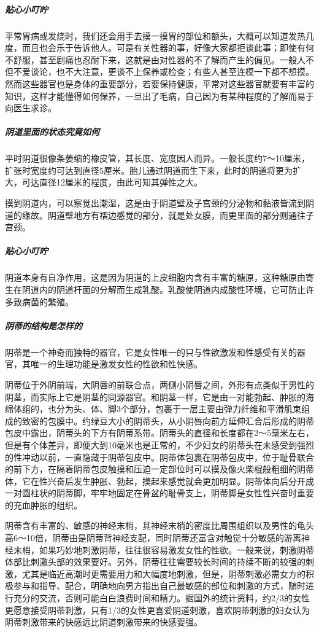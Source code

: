 \begin{enumerate}
\subparagraph{贴心小叮咛}
平常胃病或发烧时，我们还会用手去摸一摸胃的部位和额头，大概可以知道发热几度，而且也会乐于告诉他人。可是有关性器的事，好像大家都拒谈此事；即使有何不舒服，甚至剧痛也忍耐下来，这就是由对性器的不了解而产生的偏见。一般人不但不爱谈论，也不大注意，更谈不上保养或检查；有些人甚至连模一下都不想摸。然而这些器官也是身体的重要部分，若要保持健康，平常对这些器官就要有丰富的知识，这样才能懂得如何保养，一旦出了毛病，自己因为有某种程度的了解而易于向医生求诊。

\subparagraph{阴道里面的状态究竟如何}
平时阴道很像条萎缩的橡皮管，其长度、宽度因人而异。一般长度约7～10厘米，扩张时宽度约可达到直径5厘米。胎儿通过阴道而生下来，此时的阴道将更为扩大，可达直径12厘米的程度，由此可知其弹性之大。

摸到阴道内，可以察觉出潮湿，这是由于阴道壁及子宫颈的分泌物和黏液皆流到阴道的缘故。阴道壁地方有褶边感觉的部分，就是处女膜，而更里面的部分则通往子宫颈。

\subparagraph{贴心小叮咛}
阴道本身有自净作用，这是因为阴道的上皮细胞内含有丰富的糖原，这种糖原由寄生在阴道内的阴道杆菌的分解而生成乳酸。乳酸使阴道内成酸性环境，它可防止许多致病菌的繁殖。

\subparagraph{阴蒂的结构是怎样的}
阴蒂是一个神奇而独特的器官，它是女性唯一的只与性欲激发和性感受有关的器官，其唯一的生理功能是激发女性的性欲和性快感。

阴蒂位于外阴前端，大阴唇的前联合点，两侧小阴唇之间，外形有点类似于男性的阴茎，而实际上它是阴茎的同源器官。和阴茎一样，它是由一对能勃起、肿胀的海绵体组的，也分为头、体、脚3个部分，包裹于一层主要由弹力纤维和平滑肌束组成的致密的包膜中。约绿豆大小的阴蒂头，从小阴唇向前方延伸汇合后形成的阴蒂包皮中露出，阴蒂头的下方有阴蒂系带。阴蒂头的直径和长度都在2～5毫米左右，但是有个体差异，即便大到10毫米也是正常的，不少妇女的阴蒂头在未感受到强烈的性冲动以前，一直隐藏于阴蒂包皮中。阴蒂体包裹在阴蒂包皮中，位于耻骨联合的前下方，在隔着阴蒂包皮触摸和压迫一定部位时可以摸及像火柴棍般粗细的阴蒂体，它在性兴奋后发生肿胀、勃起，摸起来感觉就会更加明显。阴蒂体向后分开成一对圆柱状的阴蒂脚，牢牢地固定在骨盆的耻骨支上，阴蒂脚是女性性兴奋时重要的充血肿胀的组织。

阴蒂含有丰富的、敏感的神经末梢，其神经末梢的密度比周围组织以及男性的龟头高6～10倍，阴蒂由是阴蒂背神经支配，同时阴蒂还富含对触觉十分敏感的游离神经末梢，如果巧妙地刺激阴蒂，往往很容易激发女性的性欲。一般来说，刺激阴蒂体部比刺激头部的效果要好。另外，阴蒂往往需要较长时间的持续不断的较强的刺激，尤其是临近高潮时更需要用力和大幅度地刺激，但是，阴蒂刺激必需女方的积极参与和指导、配合，明确地向男方指出自己最敏感的部位和刺激的方式，随时进行充分的交流，否则可能白白浪费时间和精力。据国外的统计资料，约2/3的女性更愿意接受阴蒂刺激，只有1/3的女性更喜爱阴道刺激，喜欢阴蒂刺激的妇女认为阴蒂刺激带来的快感远比阴道刺激带来的快感要强。


\end{enumerate}
